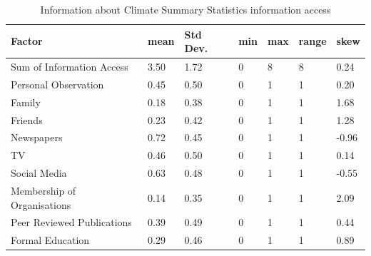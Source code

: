 \begin{center}
\begin{table}[H]
    \centering
    \begin{tabular}{|l|l|l|l|l|l|l|}
    \hline
        \textbf{Factor} & \textbf{mean} & \textbf{Std Dev}. & \textbf{ min} & \textbf{max} & \textbf{ range} & \textbf{skew}  \\ \hline
        
      Sum of Information Access & 3.50 & 1.72 & 0 & 8 & 8 & 0.24  \\ \hline
        Personal Observation  & 0.45 & 0.50 & 0 & 1 & 1 & 0.20 \\ \hline
        Family & 0.18 & 0.38 & 0 & 1 & 1 & 1.68  \\ \hline
        Friends & 0.23 & 0.42 & 0 & 1 & 1 & 1.28  \\ \hline
        Newspapers & 0.72 & 0.45 & 0 & 1 & 1 & -0.96 \\ \hline
        TV & 0.46 & 0.50 & 0 & 1 & 1 & 0.14 \\ \hline
        Social Media & 0.63 & 0.48 & 0 & 1 & 1 & -0.55 \\ \hline
        Membership of Organisations & 0.14 & 0.35 & 0 & 1 & 1 & 2.09 \\ \hline
       Peer Reviewed Publications & 0.39 & 0.49 & 0 & 1 & 1 & 0.44 \\ \hline
        Formal Education & 0.29 & 0.46 & 0 & 1 & 1 & 0.89 \\ \hline
        
         \end{tabular}
    \caption{Information about Climate Summary Statistics information access}
\label{table:summary_stats_info_access}
\end{table}
\end{center}

